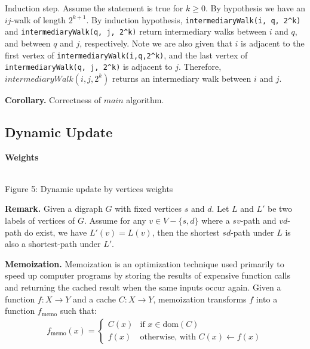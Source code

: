 Induction step. Assume the statement is true for $k \geq 0$. By hypothesis we have an $ij$-walk of length $2^{k+1}$. By induction hypothesis, \verb#intermediaryWalk(i, q, 2^k)# and \verb#intermediaryWalk(q, j, 2^k)# return intermediary walks between $i$ and $q$, and between $q$ and $j$, respectively. Note we are also given that $i$ is adjacent to the first vertex of \verb#intermediaryWalk(i,q,2^k)#, and the last vertex of \verb#intermediaryWalk(q, j, 2^k)# is adjacent to $j$. Therefore, $intermediaryWalk(i,j,2^k)$ returns an intermediary walk between $i$ and $j$.

\textbf{Corollary.} Correctness of $main$ algorithm.


\subsection{Dynamic Update}

\textbf{Weights}

\begin{center}
     \\
    Figure 5: Dynamic update by vertices weights
\end{center}

\textbf{Remark.} Given a digraph $G$ with fixed vertices $s$ and $d$. Let $L$ and $L'$ be two labels of vertices of $G$. Assume for any $v \in V - \{s,d\}$ where a $sv$-path and $vd$-path do exist, we have $L'(v) = L(v)$, then the shortest $sd$-path under $L$ is also a shortest-path under $L'$.


\textbf{Memoization.} Memoization is an optimization technique used primarily to speed up computer programs by storing the results of expensive function calls and returning the cached result when the same inputs occur again. Given a function $f: X \to Y$ and a cache $C: X \to Y$, memoization transforms $f$ into a function $f_{\text{memo}}$ such that:
\begin{align*}
  f_{\text{memo}}(x) = 
  \begin{cases} 
  C(x) & \text{if } x \in \text{dom}(C) \\
  f(x) & \text{otherwise, with } C(x) \leftarrow f(x)
  \end{cases}
\end{align*}

